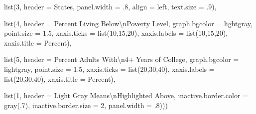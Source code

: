 \documentclass[
]{krantz}
\makeatletter
\newenvironment{Shaded}{\begin{snugshade}}{\end{snugshade}}
\newcommand{\AttributeTok}[1]{\textcolor[rgb]{0.61,0.61,0.61}{#1}}
\newcommand{\DecValTok}[1]{\textcolor[rgb]{0.06,0.06,0.06}{#1}}
\newcommand{\FloatTok}[1]{\textcolor[rgb]{0.06,0.06,0.06}{#1}}
\newcommand{\FunctionTok}[1]{\textcolor[rgb]{0,0,0}{#1}}
\newcommand{\NormalTok}[1]{#1}
\newcommand{\SpecialCharTok}[1]{\textcolor[rgb]{0,0,0}{#1}}
\newcommand{\StringTok}[1]{\textcolor[rgb]{0.5,0.5,0.5}{#1}}
\newenvironment{kframe}{%
\medskip{}
\setlength{\fboxsep}{.8em}
 \def\at@end@of@kframe{}%
 \ifinner\ifhmode%
  \def\at@end@of@kframe{\end{minipage}}%
  \begin{minipage}{\columnwidth}%
 \fi\fi%
 \def\FrameCommand##1{\hskip\@totalleftmargin \hskip-\fboxsep
 \colorbox{shadecolor}{##1}\hskip-\fboxsep
     \hskip-\linewidth \hskip-\@totalleftmargin \hskip\columnwidth}%
 \MakeFramed {\advance\hsize-\width
   \@totalleftmargin\z@ \linewidth\hsize
   \@setminipage}}%
 {\par\unskip\endMakeFramed%
 \at@end@of@kframe}
\renewenvironment{Shaded}{\begin{kframe}}{\end{kframe}}
\makeatother
\begin{document}
\begin{Shaded}
\begin{Highlighting}[]
            \FunctionTok{list}\NormalTok{(}\DecValTok{3}\NormalTok{, }\AttributeTok{header =} \StringTok{\textquotesingle{}States\textquotesingle{}}\NormalTok{, }\AttributeTok{panel.width =}\NormalTok{ .}\DecValTok{8}\NormalTok{, }
                \AttributeTok{align =} \StringTok{\textquotesingle{}left\textquotesingle{}}\NormalTok{, }\AttributeTok{text.size =}\NormalTok{ .}\DecValTok{9}\NormalTok{),}

            \FunctionTok{list}\NormalTok{(}\DecValTok{4}\NormalTok{, }\AttributeTok{header =} \StringTok{\textquotesingle{}Percent Living Below}\SpecialCharTok{\textbackslash{}n}\StringTok{Poverty Level\textquotesingle{}}\NormalTok{,}
                \AttributeTok{graph.bgcolor =} \StringTok{\textquotesingle{}lightgray\textquotesingle{}}\NormalTok{, }\AttributeTok{point.size =} \FloatTok{1.5}\NormalTok{,}
                \AttributeTok{xaxis.ticks =} \FunctionTok{list}\NormalTok{(}\DecValTok{10}\NormalTok{,}\DecValTok{15}\NormalTok{,}\DecValTok{20}\NormalTok{), }\AttributeTok{xaxis.labels =} \FunctionTok{list}\NormalTok{(}\DecValTok{10}\NormalTok{,}\DecValTok{15}\NormalTok{,}\DecValTok{20}\NormalTok{),}
                \AttributeTok{xaxis.title =} \StringTok{\textquotesingle{}Percent\textquotesingle{}}\NormalTok{),}

            \FunctionTok{list}\NormalTok{(}\DecValTok{5}\NormalTok{, }\AttributeTok{header =} \StringTok{\textquotesingle{}Percent Adults With}\SpecialCharTok{\textbackslash{}n}\StringTok{4+ Years of College\textquotesingle{}}\NormalTok{,}
                \AttributeTok{graph.bgcolor =} \StringTok{\textquotesingle{}lightgray\textquotesingle{}}\NormalTok{, }\AttributeTok{point.size =} \FloatTok{1.5}\NormalTok{,}
                \AttributeTok{xaxis.ticks =} \FunctionTok{list}\NormalTok{(}\DecValTok{20}\NormalTok{,}\DecValTok{30}\NormalTok{,}\DecValTok{40}\NormalTok{), }
                \AttributeTok{xaxis.labels =} \FunctionTok{list}\NormalTok{(}\DecValTok{20}\NormalTok{,}\DecValTok{30}\NormalTok{,}\DecValTok{40}\NormalTok{), }
                \AttributeTok{xaxis.title =} \StringTok{\textquotesingle{}Percent\textquotesingle{}}\NormalTok{),}
    
            \FunctionTok{list}\NormalTok{(}\DecValTok{1}\NormalTok{, }\AttributeTok{header =} \StringTok{\textquotesingle{}Light Gray Means}\SpecialCharTok{\textbackslash{}n}\StringTok{Highlighted Above\textquotesingle{}}\NormalTok{, }
                \AttributeTok{inactive.border.color =} \FunctionTok{gray}\NormalTok{(.}\DecValTok{7}\NormalTok{), }\AttributeTok{inactive.border.size =} \DecValTok{2}\NormalTok{, }
                \AttributeTok{panel.width =}\NormalTok{ .}\DecValTok{8}\NormalTok{)))}
\end{Highlighting}
\end{Shaded}
\end{document}
